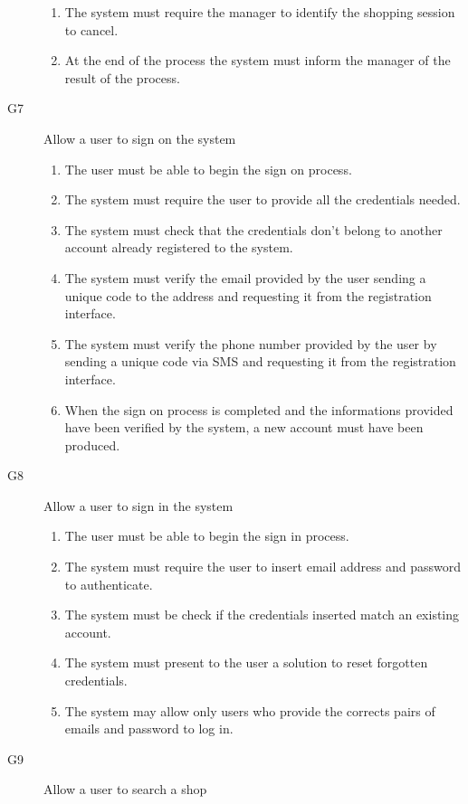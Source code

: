 \begin{description}
\begin{enumerate}[resume*]
            \item The system must require the manager to identify the shopping session to cancel.
            \item At the end of the process the system must inform the manager of the result of the process.
        \end{enumerate}
    \item [G7] Allow a user to sign on the system
        \begin{enumerate}[resume*]
            \item The user must be able to begin the sign on process.
            \item The system must require the user to provide all the credentials needed.
            \item The system must check that the credentials don't belong to another account already registered to the system.
            \item The system must verify the email provided by the user sending a unique code to the address and requesting it from the registration interface.
            \item The system must verify the phone number provided by the user by sending a unique code via SMS and requesting it from the registration interface.
            \item When the sign on process is completed and the informations provided have been verified by the system, a new account must have been produced.
        \end{enumerate}
    \item [G8] Allow a user to sign in the system
        \begin{enumerate}[resume*]
            \item The user must be able to begin the sign in process.
            \item The system must require the user to insert email address and password to authenticate.
            \item The system must be check if the credentials inserted match an existing account.
            \item The system must present to the user a solution to reset forgotten credentials.
            \item The system may allow only users who provide the corrects pairs of emails and password to log in.
        \end{enumerate}
    \item [G9] Allow a user to search a shop
        \begin{enumerate}[resume*]

\end{enumerate}
\end{description}
